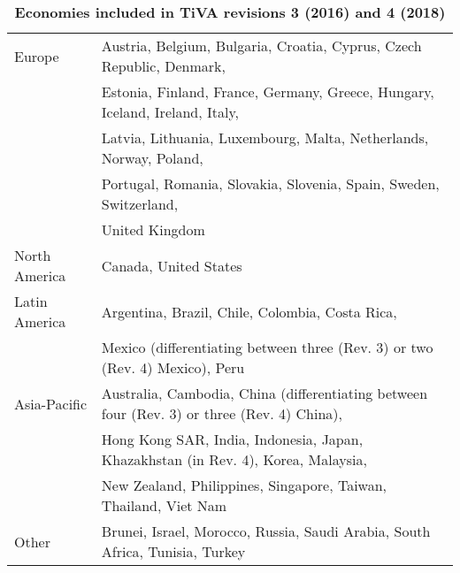 \documentclass[12pt,a4paper]{paper}
\begin{document}
\begin{table}[!h]
\begin{threeparttable}
\centering
\centering
\caption{\small{\textbf{Economies included in TiVA revisions 3 (2016) and 4 (2018)}}}
\small
\begin{tabular}{ll}
\hline\hline
Europe & Austria, Belgium, Bulgaria, Croatia, Cyprus, Czech Republic, Denmark,\\
& Estonia, Finland, France, Germany, Greece, Hungary, Iceland, Ireland, Italy,\\
& Latvia, Lithuania, Luxembourg, Malta, Netherlands, Norway, Poland,\\
&Portugal, Romania, Slovakia, Slovenia, Spain, Sweden, Switzerland,\\
& United Kingdom\\
North  America& Canada, United States\\
Latin America & Argentina, Brazil, Chile, Colombia, Costa Rica, \\ 
&Mexico (differentiating between three (Rev. 3) or two (Rev. 4) Mexico), Peru\\
Asia-Pacific & Australia, Cambodia, China (differentiating between four (Rev. 3) or three (Rev. 4) China), \\
& Hong Kong SAR, India, Indonesia, Japan, Khazakhstan (in Rev. 4), Korea, Malaysia, \\
& New Zealand, Philippines, Singapore, Taiwan, Thailand, Viet Nam\\
Other & Brunei, Israel, Morocco, Russia, Saudi Arabia, South Africa, Tunisia, Turkey\\
\hline\hline
\end{tabular} 
\label{tab:tiva}
\end{threeparttable}
\end{table} 
\end{document}
